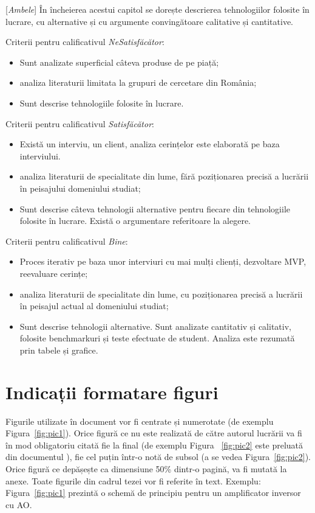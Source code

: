 \documentclass[12pt,a4paper]{report}
\newcommand{\worktype}[1]{[\textit{#1}] }
\newcommand{\dezvoltare}{\worktype{Dezvoltare de produs}}
\newcommand{\cercetare}{\worktype{Cercetare}}
\newcommand{\ambele}{\worktype{Ambele}}
\begin{document}
\ambele În încheierea acestui capitol se dorește descrierea tehnologiilor folosite în lucrare, cu alternative și cu argumente convingătoare calitative și cantitative.  

Criterii pentru calificativul \textit{Ne\textit{Satisfăcător}}: 
\begin{itemize}
	\item \dezvoltare Sunt analizate superficial câteva produse de pe piață; 
	\item \cercetare analiza literaturii limitata la grupuri de cercetare din România;
	\item \ambele Sunt descrise tehnologiile folosite în lucrare. 
\end{itemize}

Criterii pentru calificativul \textit{Satisfăcător}:
\begin{itemize}
	\item \dezvoltare Există un interviu, un client, analiza cerințelor este elaborată pe baza interviului.
	\item \cercetare analiza literaturii de specialitate din lume, fără poziționarea precisă a lucrării în peisajului domeniului studiat;
	\item \ambele Sunt descrise câteva tehnologii alternative pentru fiecare din tehnologiile folosite în lucrare. Există o argumentare referitoare la alegere.
\end{itemize}

Criterii pentru calificativul \textit{Bine}:
\begin{itemize}
	\item \dezvoltare Proces iterativ pe baza unor interviuri cu mai mulți clienți, dezvoltare MVP, reevaluare cerințe;
	\item \cercetare analiza literaturii de specialitate din lume, cu poziționarea precisă a lucrării în peisajul actual al domeniului studiat; 
	\item \ambele Sunt descrise tehnologii alternative. Sunt analizate cantitativ și calitativ, folosite benchmarkuri și teste efectuate de student. Analiza este rezumată prin tabele și grafice.
\end{itemize}

\section{Indicații formatare figuri}

Figurile utilizate în document vor fi centrate și numerotate (de exemplu Figura~\ref{fig:pic1}). 
Orice figură ce nu este realizată de către autorul lucrării va fi în mod obligatoriu citată fie la final (de exemplu Figura ~\ref{fig:pic2} este preluată din documentul \cite{}), fie cel puțin într-o notă de subsol (a se vedea Figura~\ref{fig:pic2}). Orice figură ce depășește ca dimensiune 50\% dintr-o pagină, va fi mutată la anexe. Toate figurile din cadrul tezei vor fi referite în text. Exemplu: Figura~\ref{fig:pic1} prezintă o schemă de principiu pentru un amplificator inversor cu AO. 
\end{document}
